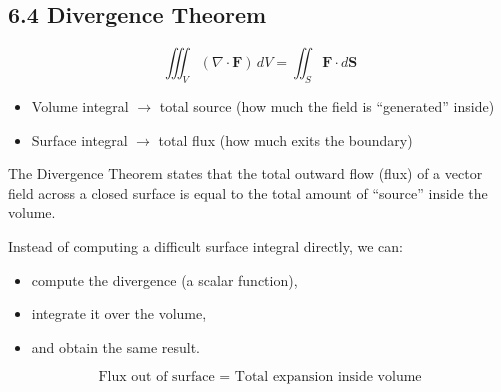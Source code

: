 \subsection*{6.4 Divergence Theorem}

\begin{conceptbox}
    \begin{equation*}
        \iiint_V (\nabla \cdot \mathbf{F})\, dV = \iint_S \mathbf{F}\cdot d\mathbf{S}
    \end{equation*}
\end{conceptbox}

\begin{itemize}
    \item Volume integral $\rightarrow$ total source (how much the field is “generated” inside)
    \item Surface integral $\rightarrow$ total flux (how much exits the boundary)
\end{itemize}

The Divergence Theorem states that the total outward flow (flux) of a vector field across a closed surface is equal to the total amount of “source” inside the volume.

Instead of computing a difficult surface integral directly, we can:
\begin{itemize}
    \item compute the divergence (a scalar function),
    \item integrate it over the volume,
    \item and obtain the same result.
\end{itemize}

\[
    \boxed{\text{Flux out of surface = Total expansion inside volume}}
\]

